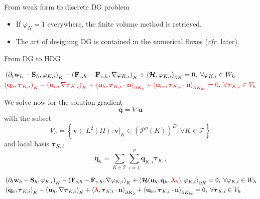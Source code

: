 \documentclass[24pt,t,table, aspectratio=169]{beamer}
\newcommand{\vecu}{\mathbf{u}}
\newcommand{\vecF}{\mathbf{F}}
\newcommand{\vecS}{\mathbf{S}}
\newcommand{\vecq}{\mathbf{q}}
\newcommand{\vecw}{\mathbf{w}}
\newcommand{\vectau}{\boldsymbol{\tau}}
\newcommand{\vecHcal}{\boldsymbol{\mathcal{H}}}
\newcommand{\veclambda}{\boldsymbol{\lambda}}
\newcommand{\tesselation}{\mathcal{T}}
\newcommand{\vecn}{\mathbf{n}}
\newcommand{\vecv}{\mathbf{v}}
\begin{document}
\begin{frame}{From weak form to discrete DG problem}
{\begin{itemize}
\item If $\varphi_K = 1$ everywhere, the finite volume method is retrieved.

\item The art of designing DG is contained in the numerical fluxes (\textit{cfr.} later).
\end{itemize}
}

\end{frame}

\begin{frame}{From DG to HDG}

{
\begin{equation*}
\begin{aligned}
& \left(\partial_t \vecw_{h} - \vecS_{h}, \varphi_{K,i} \right)_{K} - \left(\vecF_{c, {h}} - \vecF_{v, {h}}, \nabla \varphi_{K,i} \right)_{K} + \left\langle \vecHcal, \varphi_{K,i} \right\rangle_{\partial K} = 0, \; \forall \varphi_{K,i} \in W_h\\
& \textcolor{red}{\left(\vecq_h, \vectau_{K,i}\right)_{K} - \left(\vecu_h, \nabla \vectau_{K,i}\right)_{K} + \left\langle \vecu_h, \vectau_{K,i} \cdot \vecn \right\rangle_{\partial K_0} + \left\langle \vecu_{bc}, \vectau_{K,i} \cdot \vecn \right\rangle_{\partial K_{bc}} = 0,\; \forall \vectau_{K,i} \in V_h}
\end{aligned}
\end{equation*}

We solve now for the solution gradient
\begin{equation*}
\vecq = \nabla \vecu
\end{equation*}
with the subset
\begin{equation*}
V_h = \left\{\vecv \in L^2(\Omega) : \vecv|_K \in \left(\mathcal{P}^p(K)\right)^D, \forall K\in \tesselation\right\}
\end{equation*}
and local basis $\vectau_{K,i}$
\begin{equation*}
\vecq_h = \sum_{K\in\mathcal{T}}\sum_{i=1}^{p} \vecq_{K,i} \vectau_{K,i}
\end{equation*}

}

{
\begin{equation*}
\begin{aligned}
& \left(\partial_t \vecw_{h} - \vecS_{h}, \varphi_{K,i} \right)_{K} - \left(\vecF_{c, {h}} - \vecF_{v, {h}}, \nabla \varphi_{K,i} \right)_{K} + \left\langle \vecHcal(\vecu_h, \vecq_h, \textcolor{red}{\veclambda_h}), \varphi_{K,i} \right\rangle_{\partial K} = 0, \; \forall \varphi_{K,i} \in W_h\\
& \left(\vecq_h, \vectau_{K,i}\right)_{K} - \left(\vecu_h, \nabla \vectau_{K,i}\right)_{K} + \left\langle \textcolor{red}{\veclambda}, \vectau_{K,i} \cdot \vecn \right\rangle_{\partial K_0} + \left\langle \vecu_{bc}, \vectau_{K,i} \cdot \vecn \right\rangle_{\partial K_{bc}} = 0,\; \forall \vectau_{K,i} \in V_h
\end{aligned}
\end{equation*}

}
\end{frame}
\end{document}
